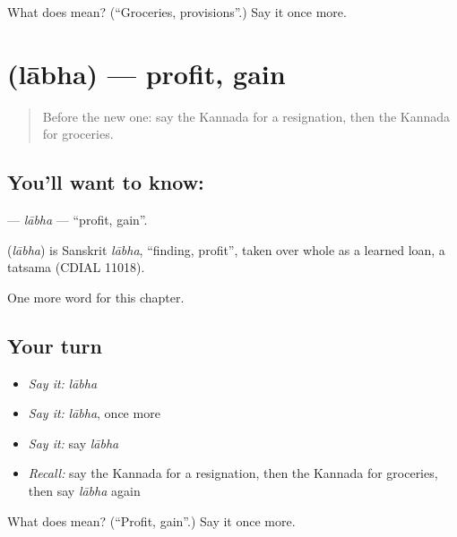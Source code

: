 \begin{tcolorbox}[breakable,colback=teal!4,colframe=teal!35!black,title={Before you move on}]
What does  mean? (\textquotedblleft{}Groceries, provisions\textquotedblright{}.) Say it once more.
\end{tcolorbox}
\section[\texorpdfstring{\kn{ಲಾಭ} (lābha)}{ಲಾಭ (lābha)}]{ (lābha) — profit, gain}

\label{lesson:KA-C233-labha}



\begin{quote}
Before the new one: say the Kannada for a resignation, then the Kannada for groceries.
\end{quote}

\subsection*{You'll want to know: }
\textbf{} — \emph{lābha} — \textquotedblleft{}profit, gain\textquotedblright{}.

\begin{cousinweb}
\textbf{} (\emph{lābha}) is Sanskrit \emph{lābha}, \textquotedblleft{}finding, profit\textquotedblright{}, taken over whole as a learned loan, a tatsama (CDIAL 11018).
\end{cousinweb}

\begin{grammarlens}[title={What you've built}]
One more word for this chapter.
\end{grammarlens}

\subsection*{Your turn}
\begin{itemize}
\raggedright
  \item \emph{Say it:} \emph{lābha}
  \item \emph{Say it:} \emph{lābha}, once more
  \item \emph{Say it:} say \emph{lābha}
  \item \emph{Recall:} say the Kannada for a resignation, then the Kannada for groceries, then say \emph{lābha} again
\end{itemize}

\begin{tcolorbox}[breakable,colback=teal!4,colframe=teal!35!black,title={Before you move on}]
What does  mean? (\textquotedblleft{}Profit, gain\textquotedblright{}.) Say it once more.
\end{tcolorbox}
